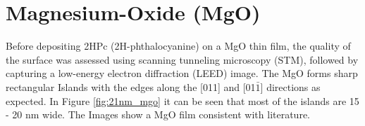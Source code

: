 \section{Magnesium-Oxide (MgO)}
Before depositing 2HPc (2H-phthalocyanine) on a MgO thin film, the quality of the surface was assessed using scanning tunneling microscopy (STM), followed by capturing a low-energy electron diffraction (LEED) image.
The MgO forms sharp rectangular Islands with the edges along the [011] and [01$\bar{1}$] directions as expected.
In Figure \ref{fig:21nm_mgo} it can be seen that most of the islands are 15 - 20 nm wide.
The Images show a MgO film consistent with literature.\cite{articlemgo}
\newpage
